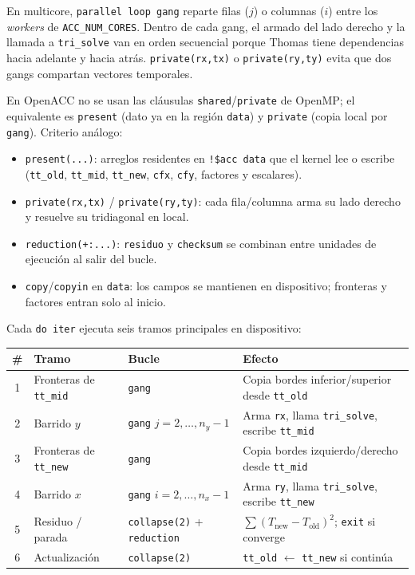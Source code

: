 \documentclass[11pt,a4paper]{article}
\begin{document}
\medskip

En multicore, \texttt{parallel loop gang} reparte filas ($j$) o columnas ($i$)
entre los \emph{workers} de \texttt{ACC\_NUM\_CORES}. Dentro de cada gang, el
armado del lado derecho y la llamada a \texttt{tri\_solve} van en orden
secuencial porque Thomas tiene dependencias hacia adelante y hacia atr\'as.
\texttt{private(rx,tx)} o \texttt{private(ry,ty)} evita que dos gangs compartan
vectores temporales.

\medskip

En OpenACC no se usan las cl\'ausulas \texttt{shared}/\texttt{private} de OpenMP;
el equivalente es \texttt{present} (dato ya en la regi\'on \texttt{data}) y
\texttt{private} (copia local por \texttt{gang}). Criterio an\'alogo:
\begin{itemize}
  \item \texttt{present(...)}: arreglos residentes en \texttt{!\$acc data} que
        el kernel lee o escribe (\texttt{tt\_old}, \texttt{tt\_mid},
        \texttt{tt\_new}, \texttt{cfx}, \texttt{cfy}, factores y escalares).
  \item \texttt{private(rx,tx)} / \texttt{private(ry,ty)}: cada fila/columna arma
        su lado derecho y resuelve su tridiagonal en local.
  \item \texttt{reduction(+:...)}: \texttt{residuo} y \texttt{checksum} se combinan
        entre unidades de ejecuci\'on al salir del bucle.
  \item \texttt{copy}/\texttt{copyin} en \texttt{data}: los campos se mantienen
        en dispositivo; fronteras y factores entran solo al inicio.
\end{itemize}

\medskip

Cada \texttt{do iter} ejecuta seis tramos principales en dispositivo:

\begin{center}
\begin{tabular}{clll}
\hline
\# & Tramo & Bucle & Efecto \\
\hline
1 & Fronteras de \texttt{tt\_mid} & \texttt{gang} &
    Copia bordes inferior/superior desde \texttt{tt\_old} \\
2 & Barrido $y$ & \texttt{gang} $j=2,\ldots,n_y-1$ &
    Arma \texttt{rx}, llama \texttt{tri\_solve}, escribe \texttt{tt\_mid} \\
3 & Fronteras de \texttt{tt\_new} & \texttt{gang} &
    Copia bordes izquierdo/derecho desde \texttt{tt\_mid} \\
4 & Barrido $x$ & \texttt{gang} $i=2,\ldots,n_x-1$ &
    Arma \texttt{ry}, llama \texttt{tri\_solve}, escribe \texttt{tt\_new} \\
5 & Residuo / parada & \texttt{collapse(2)} + \texttt{reduction} &
    $\sum (T_{\mathrm{new}}-T_{\mathrm{old}})^2$; \texttt{exit} si converge \\
6 & Actualizaci\'on & \texttt{collapse(2)} &
    \texttt{tt\_old} $\leftarrow$ \texttt{tt\_new} si contin\'ua \\
\hline
\end{tabular}
\end{center}
\end{document}
